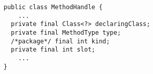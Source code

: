 {\scriptsize \begin{verbatim}
public class MethodHandle {
    ...
  private final Class<?> declaringClass;
  private final MethodType type;
  /*package*/ final int kind;
  private final int slot;
    ...
}
\end{verbatim}}